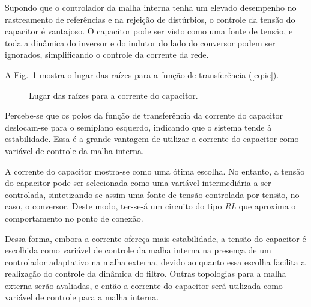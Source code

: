     Supondo que o controlador da malha interna tenha um elevado desempenho
    no rastreamento de referências e na rejeição de distúrbios,
    o controle da tensão do capacitor é vantajoso. O capacitor
    pode ser visto como uma fonte de tensão, e toda a dinâmica
    do inversor e do indutor do lado do conversor podem ser ignorados,
    simplificando o controle da corrente da rede.

    A Fig.~\ref{fig:rlocus_ic} mostra o lugar das raízes para a função de
    transferência (\ref{eq:ic}).

    \begin{figure}[htb]
        \renewcommand\figurename{Fig.}
        \caption{Lugar das raízes para a corrente do capacitor.}
        \label{fig:rlocus_ic}
    \end{figure}

    Percebe-se que os polos da função de transferência da corrente do capacitor
    deslocam-se para o semiplano esquerdo, indicando que o sistema tende à
    estabilidade. Essa é a grande vantagem de utilizar a corrente do capacitor
    como variável de controle da malha interna.

    A corrente do capacitor mostra-se como uma ótima escolha. No entanto, a tensão
    do capacitor pode ser selecionada como uma variável intermediária a ser controlada,
    sintetizando-se assim uma fonte de tensão controlada por tensão, no caso, o
    conversor. Deste modo, ter-se-á um circuito do tipo \textit{RL} que aproxima o
    comportamento no ponto de conexão.

    Dessa forma, embora a corrente ofereça mais estabilidade, a tensão do capacitor
    é escolhida como variável de controle da malha interna na presença de um controlador
    adaptativo na malha externa, devido ao quanto essa escolha facilita a realização do
    controle da dinâmica do filtro. Outras topologias para a malha externa serão
    avaliadas, e então a corrente do capacitor será utilizada como variável de
    controle para a malha interna.



